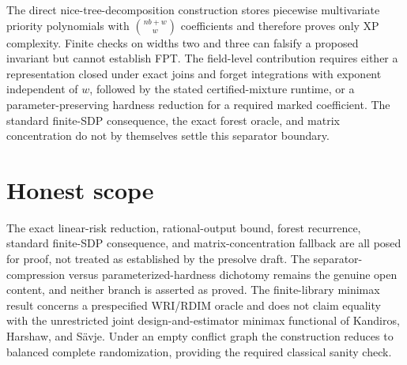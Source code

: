 \documentclass{article}
\begin{document}
The direct nice-tree-decomposition construction stores piecewise multivariate priority polynomials with \(\binom{nb+w}{w}\) coefficients and therefore proves only XP complexity. Finite checks on widths two and three can falsify a proposed invariant but cannot establish FPT. The field-level contribution requires either a representation closed under exact joins and forget integrations with exponent independent of \(w\), followed by the stated certified-mixture runtime, or a parameter-preserving hardness reduction for a required marked coefficient. The standard finite-SDP consequence, the exact forest oracle, and matrix concentration do not by themselves settle this separator boundary.

\section{Honest scope}

The exact linear-risk reduction, rational-output bound, forest recurrence, standard finite-SDP consequence, and matrix-concentration fallback are all posed for proof, not treated as established by the presolve draft. The separator-compression versus parameterized-hardness dichotomy remains the genuine open content, and neither branch is asserted as proved. The finite-library minimax result concerns a prespecified WRI/RDIM oracle and does not claim equality with the unrestricted joint design-and-estimator minimax functional of Kandiros, Harshaw, and Sävje. Under an empty conflict graph the construction reduces to balanced complete randomization, providing the required classical sanity check.
\end{document}
